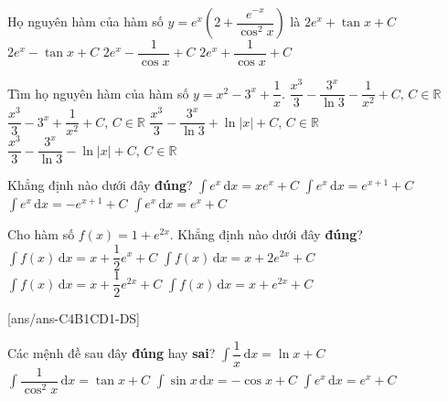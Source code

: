 \begin{ex}%
	Họ nguyên hàm của hàm số $y=e^x\left(2+\dfrac{e^{-x}}{\cos^2x}\right) $ là
	\choice
	{\True $2e^x+\tan x+C$}
	{$2e^x-\tan x+C$}
	{$2e^x-\dfrac{1}{\cos x}+C$}
	{$2e^x+\dfrac{1}{\cos x}+C$}
\end{ex}

\begin{ex}%
	Tìm họ nguyên hàm của hàm số $y=x^2-3^x+\dfrac{1}{x}$.
	\choice
	{$\dfrac{x^3}{3}-\dfrac{3^x}{\ln 3}-\dfrac{1}{x^2}+C,\,C\in \mathbb{R}$}
	{$\dfrac{x^3}{3}-3^x+\dfrac{1}{x^2}+C,\,C\in \mathbb{R}$}
	{\True $\dfrac{x^3}{3}-\dfrac{3^x}{\ln 3}+\ln \left|x\right|+C,\,C\in \mathbb{R}$}
	{$\dfrac{x^3}{3}-\dfrac{3^x}{\ln 3}-\ln \left|x\right|+C,\,C\in \mathbb{R}$}
\end{ex}

\begin{ex}%
	Khẳng định nào dưới đây \textbf{đúng}?
	\choice
	{$\displaystyle\int e^x \mathrm{\,d}x=xe^x+C$}
	{$\displaystyle\int e^x \mathrm{\,d}x=e^{x+1}+C$}
	{$\displaystyle\int e^x \mathrm{\,d}x=-e^{x+1}+C$}
	{\True $\displaystyle\int e^x \mathrm{\,d}x=e^x+C$}
\end{ex}

\begin{ex}%
	Cho hàm số $f(x)=1+e^{2x}$. Khẳng định nào dưới đây \textbf{đúng}?
	\choice
	{$\displaystyle\int f(x) \mathrm{\,d}x=x+\dfrac{1}{2}e^x+C$}
	{$\displaystyle\int f(x) \mathrm{\,d}x=x+2e^{2x}+C$}
	{\True $\displaystyle\int f(x) \mathrm{\,d}x=x+\dfrac{1}{2}e^{2x}+C$}
	{$\displaystyle\int f(x) \mathrm{\,d}x=x+e^{2x}+C$}
\end{ex}
{}[ans/ans-C4B1CD1-DS]
\begin{ex}%
	Các mệnh đề sau đây \textbf{đúng} hay \textbf{sai}?
	\choiceTF
	{$\displaystyle\int \dfrac{1}{x} \mathrm{\,d}x=\ln x+C$}
	{\True $\displaystyle\int \dfrac{1}{\cos^2x} \mathrm{\,d}x=\tan x+C$}
	{\True $\displaystyle\int \sin x \mathrm{\,d}x=-\cos x+C$}
	{\True $\displaystyle\int e^x \mathrm{\,d}x=e^x+C$}
\end{ex}


